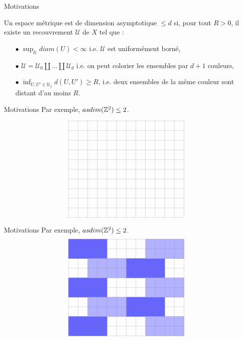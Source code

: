 \begin{frame}{Motivations}

\begin{definitionfr}
Un espace métrique est de dimension asymptotique $\leq d$ si, pour tout $R>0$, il existe un recouvrement $\mathcal U$ de $X$  tel que :
\vspace{0.3 cm}
\begin{itemize}
\item[$\bullet$] $\sup_{\mathcal U} diam(U)<\infty$ i.e. $\mathcal U$ est uniformément borné,
\vspace{0.3 cm}
\item[$\bullet$] $\mathcal U = \mathcal U_0 \coprod ... \coprod \mathcal U_d$ i.e. on peut colorier les ensembles par $d+1$ couleurs,
\vspace{0.3 cm}
\item[$\bullet$] $\inf_{U,U'\in\mathcal U_j} d(U,U')\geq R$, i.e. deux ensembles de la même couleur sont distant d'au moins $R$.
 \end{itemize}
\end{definitionfr}
\end{frame}

\begin{frame}{Motivations}
Par exemple, $asdim(\mathbb Z^2) \leq 2$.

\[\begin{tikzpicture}
\draw [very thin, gray] (0,0) grid[step=0.5] (6,5);
\end{tikzpicture}\]
\end{frame}


\begin{frame}{Motivations}
Par exemple, $asdim(\mathbb Z^2) \leq 2$.
\[\begin{tikzpicture}

\draw[fill, blue!60] (0,0) rectangle (2,1) ; 
\draw[fill, blue!60] (0,2) rectangle (2,3) ; 
\draw[fill, blue!60] (0,4) rectangle (2,5) ; 
\draw[fill, blue!60] (3,1) rectangle (5,2) ;
\draw[fill, blue!60] (3,3) rectangle (5,4) ; 

\draw[fill, blue!30] (4,0) rectangle (6,1) ; 
\draw[fill, blue!30] (4,2) rectangle (6,3) ; 
\draw[fill, blue!30] (4,4) rectangle (6,5) ; 
\draw[fill, blue!30] (1,1) rectangle (3,2) ; 
\draw[fill, blue!30] (1,3) rectangle (3,4) ; 

\draw [very thin, gray] (0,0) grid[step=0.5] (6,5);
\end{tikzpicture}\]
\end{frame}

